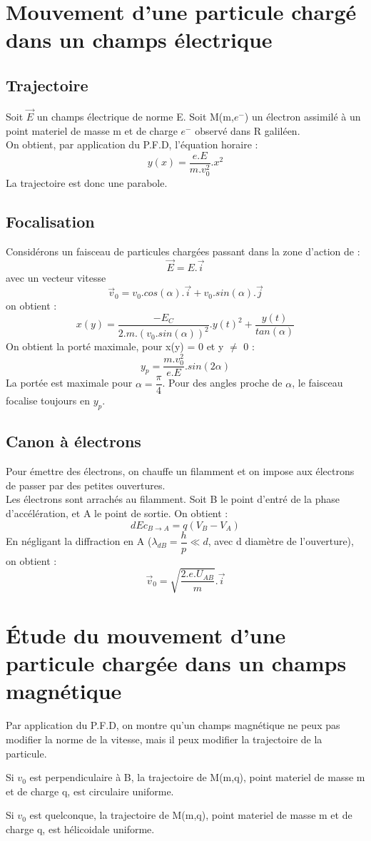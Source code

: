 \section{Mouvement d'une particule chargé dans un champs électrique}
\subsection{Trajectoire}
Soit $\overrightarrow{E}$ un champs électrique de norme E.
Soit M(m,$e^-$) un électron assimilé à un point materiel de masse m et de charge $e^-$ observé dans R galiléen.\\
On obtient, par application du P.F.D, l'équation horaire : 
$$y(x) = \dfrac{e.E}{m.v_0^2}.x^2$$
La trajectoire est donc une parabole.
\subsection{Focalisation}
Considérons un faisceau de particules chargées passant dans la zone d'action de : $$\overrightarrow{E}=E.\overrightarrow{i}$$ 
avec un vecteur vitesse 
$$\overrightarrow{v}_0 = v_0.cos(\alpha).\overrightarrow{i} + v_0.sin(\alpha).\overrightarrow{j}$$ on obtient : 
$$x(y) = \dfrac{-E_C}{2.m.(v_0.sin(\alpha))^2}.y(t)^2 + \dfrac{y(t)}{tan(\alpha)}$$
On obtient la porté maximale, pour x(y) = 0 et y $\neq$ 0 : 
$$y_p = \dfrac{m.v_0^2}{e.E}.sin(2\alpha)$$
La portée est maximale pour $\alpha = \dfrac{\pi}{4}$. Pour des angles proche de $\alpha$, le faisceau focalise toujours en $y_p$.
\subsection{Canon à électrons}
\begin{de}
Pour émettre des électrons, on chauffe un filamment et on impose aux électrons de passer par des petites ouvertures.\\
Les électrons sont arrachés au filamment. Soit B le point d'entré de la phase d'accélération, et A le point de sortie. On obtient : 
$$dEc_{B\rightarrow A} = q(V_B-V_A)$$
En négligant la diffraction en A ($\lambda_{dB} = \dfrac{h}{p} \ll d$, avec d diamètre de l'ouverture), on obtient : 
$$\overrightarrow{v}_0 = \sqrt{\dfrac{2.e.U_{AB}}{m}}.\overrightarrow{i}$$
\end{de}
\section{Étude du mouvement d'une particule chargée dans un champs magnétique}
\begin{prop}
Par application du P.F.D, on montre qu'un champs magnétique ne peux pas modifier la norme de la vitesse, mais il peux modifier la trajectoire de la particule.
\end{prop}
\begin{prop}
Si $v_0$ est perpendiculaire à B, la trajectoire de M(m,q), point materiel de masse m et de charge q, est circulaire uniforme.
\end{prop}
\begin{prop}
Si $v_0$ est quelconque, la trajectoire de M(m,q), point materiel de masse m et de charge q, est hélicoidale uniforme.
\end{prop}
